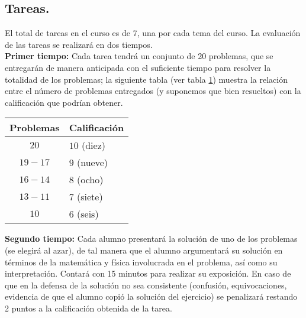 \documentclass[12pt]{article}
\begin{document}
\subsection{Tareas.}
El total de tareas en el curso es de 7, una por cada tema del curso. La evaluación de las tareas se realizará en dos tiempos.
\\
\textbf{Primer tiempo:} Cada tarea tendrá un conjunto de 20 problemas, que se entregarán de manera anticipada con el suficiente tiempo para resolver la totalidad de los problemas; la siguiente tabla (ver tabla \ref{tab:relacion}) muestra la relación entre el número de problemas entregados (y suponemos que bien resueltos) con la calificación que podrían obtener.
\begin{table}[H]
\centering
\begin{tabular}{c | l}
\hline \hline 
Problemas & Calificación \\ [1ex] \hline
$20$ & $10$ (diez) \\ \hline
$19-17$ & $9$ (nueve) \\ \hline
$16-14$ & $8$ (ocho) \\ \hline
$13-11$  & $7$ (siete) \\ \hline
$10$ & $6$ (seis) \\ [1ex] \hline
\end{tabular}
\label{tab:relacion}
\end{table} 
\textbf{Segundo tiempo:} Cada alumno presentará la solución de uno de los problemas (se elegirá al azar), de tal manera que el alumno argumentará su solución en términos de la matemática y física involucrada en el problema, así como su interpretación. Contará con 15 minutos para realizar su exposición. En caso de que en la defensa de la solución no sea consistente (confusión, equivocaciones, evidencia de que el alumno copió la solución del ejercicio) se penalizará restando 2 puntos a la calificación obtenida de la tarea.
\end{document}
